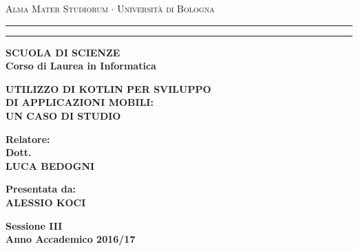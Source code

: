 \begin{titlepage}
\begin{center}
{{\Large{\textsc{Alma Mater Studiorum $\cdot$ Universit\`a di
Bologna}}}} \rule[0.1cm]{13.8cm}{0.1mm}
\rule[0.5cm]{13.8cm}{0.6mm}
{\bf SCUOLA DI SCIENZE\\
Corso di Laurea in Informatica }
\end{center}
\vspace{25mm}
\begin{center}
 {\large{\bf UTILIZZO DI KOTLIN PER SVILUPPO }}\\
 \vspace{2mm}
 {\large{\bf DI APPLICAZIONI MOBILI: }}\\
 \vspace{2mm}
 {\large{\bf UN CASO DI STUDIO}}\\
 \vspace{2mm}

 \end{center}
 \vspace{30mm}
 \par
 \noindent
 \begin{minipage}[t]{0.5\textwidth}
 {\large{\bf Relatore:\\
 Dott.\\
 LUCA BEDOGNI}}\\
 \end{minipage}
 \hfill
 \begin{minipage}[t]{0.5\textwidth}\raggedleft
 {\large{\bf Presentata da:\\
 ALESSIO KOCI}}
\end{minipage}
\vspace{30mm}
\begin{center}
{\large{\bf Sessione III\\%
Anno Accademico 2016/17}}%
\end{center}
\end{titlepage}
